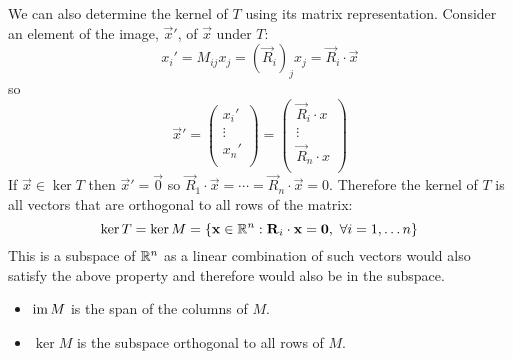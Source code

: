 \documentclass[../main.tex]{subfiles}
\begin{document}
We can also determine the kernel of $T$ using its matrix representation.
Consider an element of the image, $\vec{x}'$, of $\vec{x}$ under $T$:
\[
  x_i' = M_{i j}x_j = (\vec{R}_i)_j x_j = \vec{R}_i \cdot \vec{x}
\]
so
\[
  \vec{x}' = \begin{pmatrix}
  x_i' \\
  \vdots \\
  x_n' \\
  \end{pmatrix}
  =
  \begin{pmatrix}
  \vec{R}_i \cdot x \\
  \vdots \\
  \vec{R}_n \cdot x \\
  \end{pmatrix}
\]
If $\vec{x} \in \ker T$ then $\vec{x}' = \vec{0}$ so $\vec{R}_1 \cdot \vec{x} = \cdots = \vec{R}_n \cdot \vec{x} = 0$.
Therefore the kernel of $T$ is all vectors that are orthogonal to all rows of the matrix:
\[
  \ker T = \ker M = \{\boldsymbol{\mathbf{x}} \in \mathbb{R}^{n}: \boldsymbol{\mathbf{R}}_i \cdot \boldsymbol{\mathbf{x}} = \boldsymbol{\mathbf{0}},\ \forall i = 1, \ldots n\}
\]
This is a subspace of $\mathbb{R}^{n}$ as a linear combination of such vectors would also satisfy the above property and therefore would also be in the subspace.
\begin{remark}[Summary]
  \begin{itemize}
    \item $\operatorname{im} M$ is the span of the columns of $M$.
    \item $\ker M$ is the subspace orthogonal to all rows of $M$.
  \end{itemize}
\end{remark}
\end{document}

